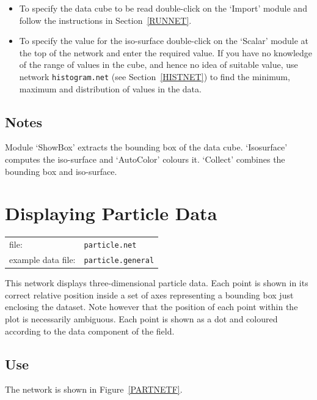 \documentclass[twoside,11pt]{starlink}
\begin{document}
\begin{itemize}

  \item To specify the data cube to be read double-click on the `Import'
   module and follow the instructions in Section~\ref{RUNNET}.

  \item To specify the value for the iso-surface double-click on the
   `Scalar' module at the top of the network and enter the required
   value.  If you have no knowledge of the range of values in the
   cube, and hence no idea of suitable value, use network \texttt{histogram.net} (see Section~\ref{HISTNET}) to find the minimum,
   maximum and distribution of values in the data.

\end{itemize}

\subsection{Notes}

Module `ShowBox' extracts the bounding box of the data cube.
`Isosurface' computes the iso-surface and `AutoColor' colours it.
`Collect' combines the bounding box and iso-surface.


\newpage
\section{Displaying Particle Data}


\begin{tabular}{ll}
file:              & \texttt{particle.net}     \\
example data file: & \texttt{particle.general} \\
\end{tabular}

This network displays three-dimensional particle data. Each point is
shown in its correct relative position inside a set of axes representing
a bounding box just enclosing the dataset. Note however that the
position of each point within the plot is necessarily ambiguous. Each
point is shown as a dot and coloured according to the data component of
the field.

\subsection{Use}

The network is shown in Figure~\ref{PARTNETF}.
\end{document}
